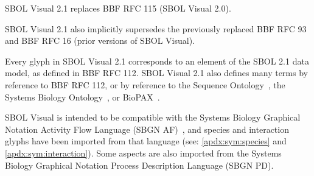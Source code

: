 
SBOL Visual 2.1 replaces BBF RFC 115 (SBOL Visual 2.0).

SBOL Visual 2.1 also implicitly supersedes the previously replaced BBF RFC 93 and BBF RFC 16 (prior versions of SBOL Visual).


Every glyph in SBOL Visual 2.1 corresponds to an element of the SBOL 2.1 data model, as defined in BBF RFC 112.
SBOL Visual 2.1 also defines many terms by reference to BBF RFC 112, 
or by reference to the Sequence Ontology~\citep{SequenceOntology},
the Systems Biology Ontology~\citep{SBO},
or BioPAX~\citep{BioPAX}.


SBOL Visual is intended to be compatible with the Systems Biology Graphical Notation Activity Flow Language (SBGN AF)~\citep{sbgn}, 
and species and interaction glyphs have been imported from that language (see: \ref{apdx:sym:species} and \ref{apdx:sym:interaction}).
Some aspects are also imported from the Systems Biology Graphical Notation Process Description Language (SBGN PD).